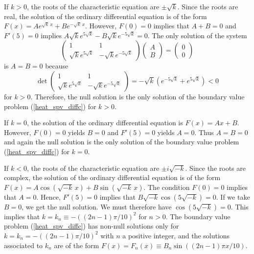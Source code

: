 \begin{egg}
If $k>0$, the roots of the characteristic equation are $\pm \sqrt{k}$.
Since the roots are real, the solution of the ordinary differential
equation is of the form
$\displaystyle F(x) = A e^{\sqrt{k}\,x} + B e^{-\sqrt{k}\, x}$.
However, $F(0)=0$ implies that $A+B=0$ and $F'(5)=0$ implies
$\displaystyle A \sqrt{k} e^{5\sqrt{k}} - B \sqrt{k} e^{-5\sqrt{k}} = 0$.
The only solution of the system
\[
\begin{pmatrix}
1 & 1 \\ \sqrt{k} e^{5\sqrt{k}} &-\sqrt{k} e^{-5\sqrt{k}}
\end{pmatrix}
\begin{pmatrix}
A \\ B
\end{pmatrix}
=
\begin{pmatrix}
0 \\ 0 
\end{pmatrix}
\]
is $A=B=0$ because
\[
\det
\begin{pmatrix}
1 & 1 \\ \sqrt{k} e^{5\sqrt{k}} & -\sqrt{k}e^{-5\sqrt{k}}
\end{pmatrix}
= -\sqrt{k} \left(e^{-5\sqrt{k}} + e^{5\sqrt{k}}\right) 
< 0
\]
for $k>0$.  Therefore, the null solution is the only solution
of the boundary value problem (\ref{heat_spv_diffc}) for $k>0$.

If $k=0$, the solution of the ordinary differential equation is $F(x)=Ax+B$.
However, $F(0)=0$ yields $B=0$ and $F'(5)=0$ yields $A = 0$.  Thus
$A=B=0$ and again the null solution is the only solution of the
boundary value problem (\ref{heat_spv_diffc}) for $k=0$.

If $k<0$, the roots of the characteristic equation are $\pm i \sqrt{-k}$.
Since the roots are complex, the solution of the ordinary differential equation is of the form
$\displaystyle
F(x) = A \cos\left(\sqrt{-k}\,x\right) + B \sin\left(\sqrt{-k}\,x\right)$.
The condition $F(0)=0$ implies that $A=0$.  Hence, $F'(5)=0$ implies that
$B \sqrt{-k} \cos\left(5\sqrt{-k}\right) = 0$.  If we take
$B=0$, we get the null solution.  We must therefore have
$\cos\left(5\sqrt{-k}\right) = 0$.  This implies that
$\displaystyle k = k_n \equiv -\left((2n-1)\pi/10\right)^2$ for
$n>0$.  The boundary value problem (\ref{heat_spv_diffc}) has
non-null solutions only for
$\displaystyle k = k_n = -\left((2n-1)\pi/10\right)^2$ with
$n$ a positive integer, and the solutions associated to $k_n$ are of the
form $\displaystyle
F(x)=F_n(x) \equiv B_n \sin\left((2n-1)\pi x/10\right)$.


\end{egg}
